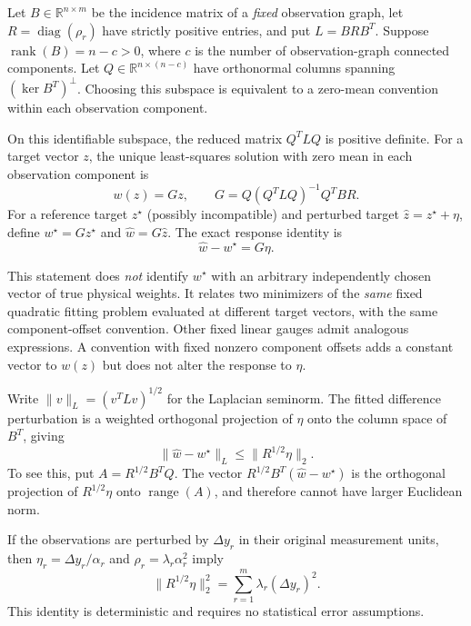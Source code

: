 Let $B\in\mathbb R^{n\times m}$ be the incidence matrix of a \emph{fixed} observation graph, let $R=\operatorname{diag}(\rho_r)$ have strictly positive entries, and put $L=BRB^T$. Suppose $\operatorname{rank}(B)=n-c>0$, where $c$ is the number of observation-graph connected components. Let $Q\in\mathbb R^{n\times(n-c)}$ have orthonormal columns spanning $(\ker B^T)^\perp$. Choosing this subspace is equivalent to a zero-mean convention within each observation component.

On this identifiable subspace, the reduced matrix $Q^TLQ$ is positive definite. For a target vector $z$, the unique least-squares solution with zero mean in each observation component is
\begin{equation}
w(z)=Gz,\qquad
G=Q(Q^TLQ)^{-1}Q^TBR.
\label{eq:fixed-fit-response-operator}
\end{equation}
For a reference target $z^\star$ (possibly incompatible) and perturbed target $\widehat z=z^\star+\eta$, define $w^\star=Gz^\star$ and $\widehat w=G\widehat z$. The exact response identity is
\begin{equation}
\widehat w-w^\star=G\eta.
\label{eq:appendix-reference-fit-response}
\end{equation}

This statement does \emph{not} identify $w^\star$ with an arbitrary independently chosen vector of true physical weights. It relates two minimizers of the \emph{same} fixed quadratic fitting problem evaluated at different target vectors, with the same component-offset convention. Other fixed linear gauges admit analogous expressions. A convention with fixed nonzero component offsets adds a constant vector to $w(z)$ but does not alter the response to $\eta$.

Write $\|v\|_L=(v^TLv)^{1/2}$ for the Laplacian seminorm. The fitted difference perturbation is a weighted orthogonal projection of $\eta$ onto the column space of $B^T$, giving
\begin{equation}
\|\widehat w-w^\star\|_L
\le\|R^{1/2}\eta\|_2.
\label{eq:energy-error-bound}
\end{equation}
To see this, put $A=R^{1/2}B^TQ$. The vector
$R^{1/2}B^T(\widehat w-w^\star)$ is the orthogonal projection of
$R^{1/2}\eta$ onto $\operatorname{range}(A)$, and therefore cannot have
larger Euclidean norm.

If the observations are perturbed by $\Delta y_r$ in their original measurement units, then $\eta_r=\Delta y_r/\alpha_r$ and $\rho_r=\lambda_r\alpha_r^2$ imply
\begin{equation}
\|R^{1/2}\eta\|_2^2=\sum_{r=1}^m\lambda_r(\Delta y_r)^2.
\label{eq:measurement-error-energy}
\end{equation}
This identity is deterministic and requires no statistical error assumptions.

